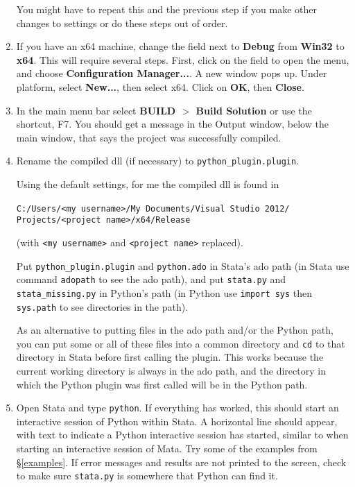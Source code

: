 \documentclass{article}
\begin{document}
\begin{enumerate}
	You might have to repeat this and the previous step if you make other changes to settings or do these steps out of order.
		
		\item If you have an x64 machine, change the field next to \textbf{Debug} from \textbf{Win32} to \textbf{x64}. This will require several steps. First, click on the field to open the menu, and choose \textbf{Configuration Manager...}. A new window pops up. Under platform, select \textbf{New...}, then select x64. Click on \textbf{OK}, then \textbf{Close}.
	
		\item In the main menu bar select \textbf{BUILD $>$ Build Solution} or use the shortcut, F7. You should get a message in the Output window, below the main window, that says the project was successfully compiled.
	
		
		\item Rename the compiled dll (if necessary) to \lstinline$python_plugin.plugin$.
		
		Using the default settings, for me the compiled dll is found in
		
		\verb|C:/Users/<my username>/My Documents/Visual Studio 2012/|\newline
		\verb|    Projects/<project name>/x64/Release|
		
		(with \verb|<my username>| and \verb|<project name>| replaced).
		
		Put \lstinline$python_plugin.plugin$ and \lstinline$python.ado$ in Stata's ado path (in Stata use command \lstinline{adopath} to see the ado path), and put \lstinline$stata.py$ and \lstinline$stata_missing.py$ in Python's path (in Python use \lstinline{import sys} then \lstinline{sys.path} to see directories in the path). 
		
		As an alternative to putting files in the ado path and/or the Python path, you can put some or all of these files into a common directory and \lstinline{cd} to that directory in Stata before first calling the plugin. This works because the current working directory is always in the ado path, and the directory in which the Python plugin was first called will be in the Python path.
	
		\item Open Stata and type \lstinline$python$. If everything has worked, this should start an interactive session of Python within Stata. A horizontal line should appear, with text to indicate a Python interactive session has started, similar to when starting an interactive session of Mata. Try some of the examples from \S\ref{examples}. If error messages and results are not printed to the screen, check to make sure \lstinline$stata.py$ is somewhere that Python can find it.
	\end{enumerate}
	
\end{document}
